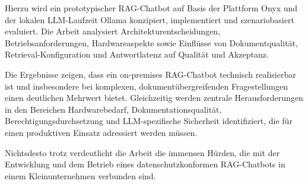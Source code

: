 Hierzu wird ein prototypischer RAG-Chatbot auf Basis der Plattform Onyx und der lokalen LLM-Laufzeit Ollama konzipiert, implementiert und szenariobasiert evaluiert. Die Arbeit analysiert Architekturentscheidungen, Betriebsanforderungen, Hardwareaspekte sowie Einflüsse von Dokumentqualität, Retrieval-Konfiguration und Antwortlatenz auf Qualität und Akzeptanz.


Die Ergebnisse zeigen, dass ein on-premises RAG-Chatbot technisch realisierbar ist und insbesondere bei komplexen, dokumentübergreifenden Fragestellungen einen deutlichen Mehrwert bietet. Gleichzeitig werden zentrale Herausforderungen in den Bereichen Hardwarebedarf, Dokumentationsqualität, Berechtigungsdurchsetzung und LLM-spezifische Sicherheit identifiziert, die für einen produktiven Einsatz adressiert werden müssen.

Nichtsdesto trotz verdeutlicht die Arbeit die immensen Hürden, die mit der Entwicklung und dem Betrieb eines datenschutzkonformen RAG-Chatbots in einem Kleinunternehmen verbunden sind.

\newpage